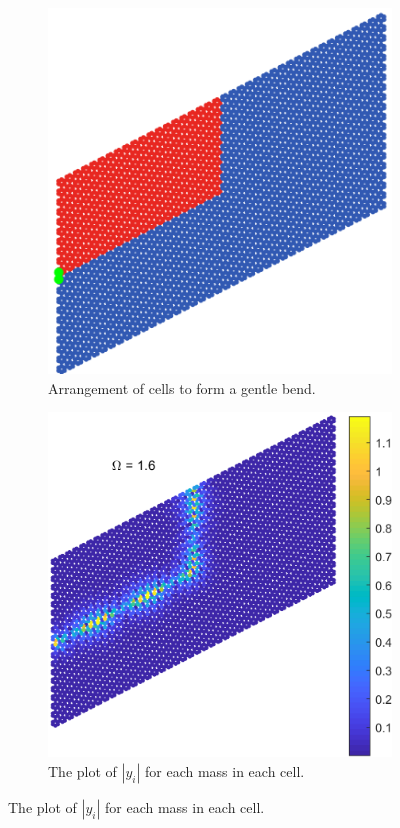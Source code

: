 \begin{figure}[!h]
\centering
\begin{subfigure}[b]{.5\textwidth}
  \centering
  \includegraphics[width=0.8\linewidth]{imgs/gentlebendarr.png}
  \caption{Arrangement of cells to form a gentle bend.}
  \label{fig:sub1}
\end{subfigure}%
\begin{subfigure}[b]{.5\textwidth}
  \centering
  \includegraphics[width=1\linewidth]{imgs/gentlebendscat.png}
  \caption{The plot of $|y_i|$ for each mass in each cell.}
  \label{fig:sub2}
\end{subfigure}


\end{figure}
